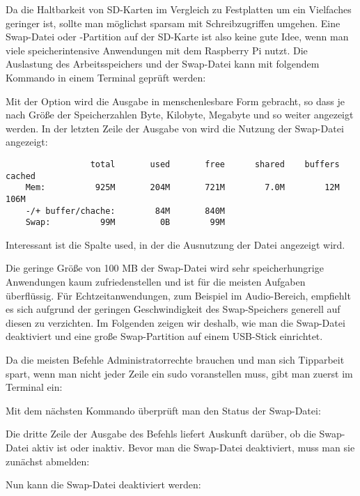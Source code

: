 Da die Haltbarkeit von SD-Karten im Vergleich zu Festplatten um ein Vielfaches geringer ist, sollte man möglichst sparsam mit Schreibzugriffen umgehen. Eine Swap-Datei oder -Partition auf der SD-Karte ist also keine gute Idee, wenn man viele speicherintensive Anwendungen mit dem Raspberry Pi nutzt. Die Auslastung des Arbeitsspeichers und der Swap-Datei kann mit folgendem Kommando in einem Terminal geprüft werden:


Mit der Option  wird die Ausgabe in menschenlesbare Form gebracht, so dass je nach Größe der Speicherzahlen Byte, Kilobyte, Megabyte und so weiter angezeigt werden. In der letzten Zeile der Ausgabe von  wird die Nutzung der Swap-Datei angezeigt:


\begin{lstlisting}
	             total       used       free      shared    buffers     cached
	Mem:          925M       204M       721M        7.0M        12M       106M
	-/+ buffer/chache:        84M       840M
	Swap:          99M         0B        99M
\end{lstlisting}


Interessant ist die Spalte used, in der die Ausnutzung der Datei angezeigt wird. 

Die geringe Größe von 100 MB der Swap-Datei wird sehr speicherhungrige Anwendungen kaum zufriedenstellen und ist für die meisten Aufgaben überflüssig. Für Echtzeitanwendungen, zum Beispiel im Audio-Bereich, empfiehlt es sich aufgrund der geringen Geschwindigkeit des Swap-Speichers generell auf diesen zu verzichten. Im Folgenden zeigen wir deshalb, wie man die Swap-Datei deaktiviert und eine große Swap-Partition auf einem USB-Stick einrichtet.

Da die meisten Befehle Administratorrechte brauchen und man sich Tipparbeit spart, wenn man nicht jeder Zeile ein sudo voranstellen muss, gibt man zuerst im Terminal ein:


Mit dem nächsten Kommando überprüft man den Status der Swap-Datei:



Die dritte Zeile der Ausgabe des Befehls liefert Auskunft darüber, ob die Swap-Datei aktiv ist oder inaktiv. Bevor man die Swap-Datei deaktiviert, muss man sie zunächst abmelden:


Nun kann die Swap-Datei deaktiviert werden:

